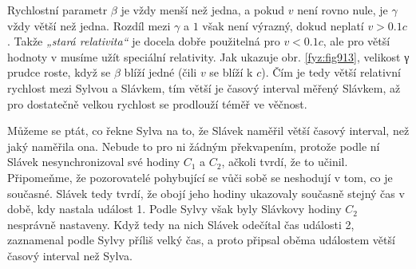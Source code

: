     Rychlostní parametr \(\beta\) je vždy menší než jedna, a pokud \(v\) není rovno nule, je
    \(\gamma\) vždy větší než jedna. Rozdíl mezi \(\gamma\) a \(1\) však není výrazný, dokud neplatí
    \(v > \num{0.1}c\). Takže \emph{„stará relativita“} je docela dobře použitelná pro \(v <
    \num{0.1}c\), ale pro větší hodnoty v musíme užít speciální relativity. Jak ukazuje obr.
    \ref{fyz:fig913}, velikost γ prudce roste, když se \(\beta\) blíží jedné (čili \(v\) se blíží k
    \(c\)). Čím je tedy větší relativní rychlost mezi Sylvou a Slávkem, tím větší je časový interval
    měřený Slávkem, až pro dostatečně velkou rychlost se prodlouží téměř ve věčnost.

    Můžeme se ptát, co řekne Sylva na to, že Slávek naměřil větší časový interval, než jaký naměřila
    ona. Nebude to pro ni žádným překvapením, protože podle ní Slávek nesynchronizoval své hodiny
    \(C_1\) a \(C_2\), ačkoli tvrdí, že to učinil. Připomeňme, že pozorovatelé pohybující se vůči
    sobě se neshodují v tom, co je současné. Slávek tedy tvrdí, že obojí jeho hodiny ukazovaly
    současně stejný čas v době, kdy nastala událost 1. Podle Sylvy však byly Slávkovy hodiny \(C_2\)
    nesprávně nastaveny. Když tedy na nich Slávek odečítal čas události 2, zaznamenal podle Sylvy
    příliš velký čas, a proto připsal oběma událostem větší časový interval než Sylva.


